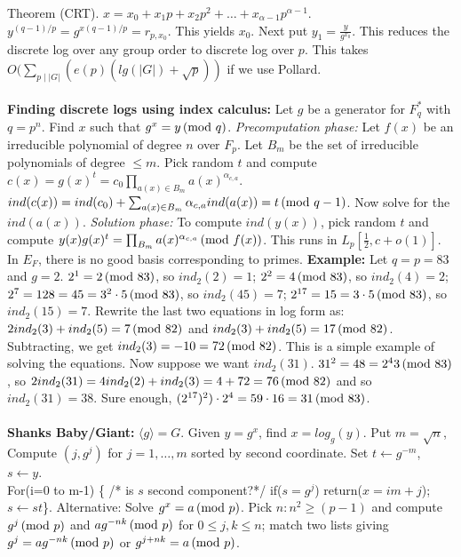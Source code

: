 Theorem (CRT).
$x= x_0 + x_1 p + x_2 p^2 + \ldots + x_{\alpha - 1} p^{\alpha - 1}$.
$y^{(q-1)/p}=g^{x(q-1)/p}=r_{p,x_{0}}$.  This yields $x_0$. Next
put $y_{1}= {\frac {y} {g^{x_{0}}}}$.  This reduces the discrete log over any group
order to discrete log over $p$.  This takes $O(\sum_{p \mid |G|} (e(p)(lg(|G|)+{\sqrt p}))$
if we use Pollard.
\\
\\
{\bf Finding discrete logs using
index calculus:}  Let $g$ be a generator for $F_q^*$ with $q=p^n$.
Find $x$ such that $g^x = y \thinspace \textnormal{(mod } q \textnormal{)}$.
\emph{Precomputation phase:}  Let $f(x)$ be an irreducible polynomial 
of degree $n$ over $F_p$. Let
$B_m$ be the set of irreducible polynomials of degree $\leq m$.  Pick random $t$ and compute
$c(x)=g(x)^t= c_0 \prod_{a(x) \in B_m} a(x)^{\alpha_{c,a}}$.
$ind(c(x))= ind(c_0) + \sum_{a(x) \in B_m} \alpha_{c,a} ind(a(x))=t \thinspace \textnormal{(mod } q-1 \textnormal{)}$.
Now solve for the $ind(a(x))$.
\emph{Solution phase:} To compute $ind(y(x))$, pick random $t$ and compute
$y(x) g(x)^t= \prod_{B_m} a(x)^{\alpha_{c,a}} \thinspace \textnormal{(mod } f(x) \textnormal{)}$.  This runs in
$L_p[{\frac 1 2}, c+o(1)]$. In $E_F$, there is no good basis corresponding to primes.
{\bf Example:} Let $q=p=83$ and $g=2$.
$2^{1}= 2 \thinspace \textnormal{(mod } 83 \textnormal{)}$, so $ind_2(2)= 1$;
$2^{2}= 4 \thinspace \textnormal{(mod } 83 \textnormal{)}$, so $ind_2(4)= 2$;
$2^{7}= 128= 45= 3^2 \cdot 5 \thinspace \textnormal{(mod } 83 \textnormal{)}$, so $ind_2(45)= 7$;
$2^{17}= 15= 3 \cdot 5 \thinspace \textnormal{(mod } 83 \textnormal{)}$, so $ind_2(15)= 7$.  Rewrite
the last two equations in log form as:
$2 ind_2(3) + ind_2(5)= 7 \thinspace \textnormal{(mod } 82 \textnormal{)}$
and
$ind_2(3) + ind_2(5)= 17 \thinspace \textnormal{(mod } 82 \textnormal{)}$.  Subtracting, we get
$ind_2(3)= -10= 72 \thinspace \textnormal{(mod } 82 \textnormal{)}$.  This is a simple example of solving the 
equations.  Now suppose we want $ind_2(31)$.
$31^2= 48 = 2^4 3 \thinspace \textnormal{(mod } 83 \textnormal{)}$, so
$2ind_2(31) = 4 ind_2(2) + ind_2(3)= 4+72 =76 \thinspace \textnormal{(mod } 82 \textnormal{)}$ and
so $ind_2(31)= 38$.  Sure enough, $(2^{17})^2)\cdot 2^4= 59 \cdot 16= 31 \thinspace \textnormal{(mod } 83 \textnormal{)}$.
\\
\\
{\bf Shanks Baby/Giant:}  $\langle g \rangle = G$.  Given $y=g^x$,
find $x= log_{g}(y)$.
Put $m= {\sqrt n}$, Compute $(j,g^{j})$ for $j= 1, \ldots , m$ sorted
by second coordinate.  Set $t \leftarrow g^{-m}$,
$s \leftarrow y$.
\\
For(i=0 to m-1) \{ /* is $s$ second component?*/ if($s= g^j$)
return($x=im+j$); $s \leftarrow st$\}.  Alternative:  Solve $g^x = a \thinspace \textnormal{(mod } p \textnormal{)}$.  Pick
$n: n^2 \ge (p-1)$ and compute $g^j \thinspace \textnormal{(mod } p \textnormal{)}$ and $ag^{-nk} \thinspace \textnormal{(mod } p \textnormal{)}$ for
$0 \le j, k \le n$; match two lists giving $g^j= a g^{-nk} \thinspace \textnormal{(mod } p \textnormal{)}$ or
$g^{j+nk}= a \thinspace \textnormal{(mod } p \textnormal{)}$.
\\
\\
